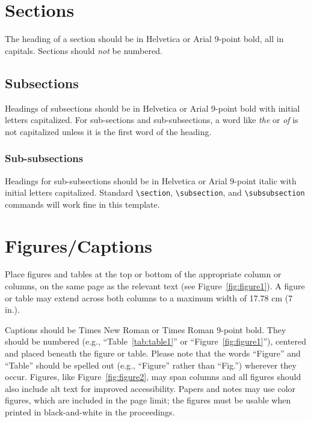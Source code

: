 \documentclass{sigchi}
\begin{document}
\section{Sections}

The heading of a section should be in Helvetica or Arial 9-point bold,
all in capitals. Sections should \textit{not} be numbered.

\subsection{Subsections}

Headings of subsections should be in Helvetica or Arial 9-point bold
with initial letters capitalized.  For sub-sections and
sub-subsections, a word like \emph{the} or \emph{of} is not
capitalized unless it is the first word of the heading.

\subsubsection{Sub-subsections}

Headings for sub-subsections should be in Helvetica or Arial 9-point
italic with initial letters capitalized.  Standard
\texttt{{\textbackslash}section}, \texttt{{\textbackslash}subsection},
and \texttt{{\textbackslash}subsubsection} commands will work fine in
this template.

\section{Figures/Captions}

Place figures and tables at the top or bottom of the appropriate
column or columns, on the same page as the relevant text (see
Figure~\ref{fig:figure1}). A figure or table may extend across both
columns to a maximum width of 17.78 cm (7 in.).



Captions should be Times New Roman or Times Roman 9-point bold.  They
should be numbered (e.g., ``Table~\ref{tab:table1}'' or
``Figure~\ref{fig:figure1}''), centered and placed beneath the figure
or table.  Please note that the words ``Figure'' and ``Table'' should
be spelled out (e.g., ``Figure'' rather than ``Fig.'') wherever they
occur. Figures, like Figure~\ref{fig:figure2}, may span columns and
all figures should also include alt text for improved accessibility.
Papers and notes may use color figures, which are included in the page
limit; the figures must be usable when printed in black-and-white in
the proceedings.
\end{document}
